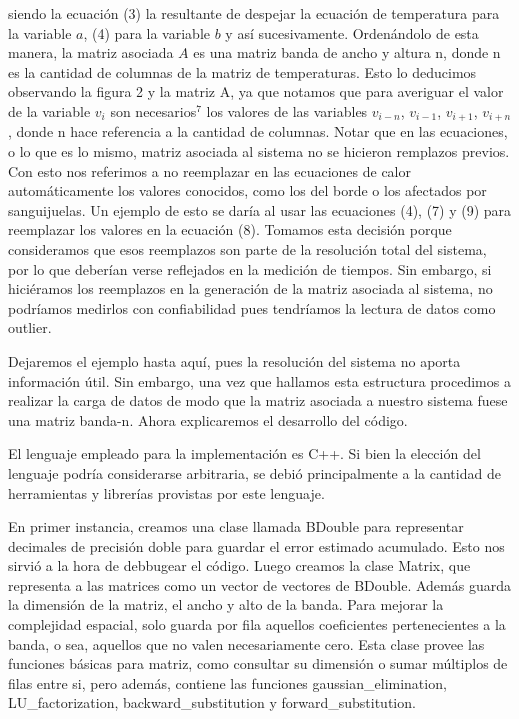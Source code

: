 siendo la ecuación (3) la resultante de despejar la ecuación de temperatura para la variable $a$, (4) para la variable $b$ y así sucesivamente.
Ordenándolo de esta manera, la matriz asociada $A$ es una matriz banda de ancho y altura n, donde n es la cantidad de columnas 
de la matriz de temperaturas. Esto lo deducimos observando la figura 2 y la matriz A,
ya que notamos que para averiguar el valor de la variable $v_{i}$ son necesarios$^7$ los valores de las variables $v_{i-n}$, $v_{i-1}$, 
$v_{i+1}$, $v_{i+n}$, donde n hace referencia a la cantidad de columnas.
Notar que en las ecuaciones, o lo que es lo mismo, matriz asociada al sistema no se hicieron remplazos previos. Con esto nos referimos a no reemplazar
 en las ecuaciones de calor automáticamente los valores conocidos, como los del borde o los afectados por sanguijuelas. Un ejemplo de esto se daría 
 al usar las ecuaciones (4), (7) y (9) para reemplazar los valores en la ecuación (8). Tomamos esta decisión porque consideramos que esos reemplazos son parte
 de la resolución total del sistema, por lo que deberían verse reflejados en la medición de tiempos. Sin embargo, si hiciéramos los reemplazos 
 en la generación de la matriz asociada al sistema, no podríamos medirlos con confiabilidad pues tendríamos la lectura de datos como outlier.

Dejaremos el ejemplo hasta aquí, pues la resolución del sistema no aporta información útil. Sin embargo, una vez que hallamos esta estructura 
procedimos a realizar la carga de datos de modo que la matriz asociada a nuestro sistema fuese una matriz banda-n. Ahora explicaremos el desarrollo del código.

El lenguaje empleado para la implementación es C++. Si bien la elección del lenguaje podría considerarse arbitraria, se debió principalmente a la 
cantidad de herramientas y librerías provistas por este lenguaje. 

En primer instancia, creamos una clase llamada BDouble para representar decimales de
precisión doble para guardar el error estimado acumulado. Esto nos sirvió a la hora de debbugear el código.
Luego creamos la clase Matrix, que representa a las matrices como un vector de vectores de BDouble. 
Además guarda la dimensión de la matriz, el ancho y alto de la banda. Para mejorar la complejidad espacial, solo guarda por fila aquellos
coeficientes pertenecientes a la banda, o sea, aquellos que no valen necesariamente cero. Esta clase provee las funciones básicas para matriz, como 
consultar su dimensión o sumar múltiplos de filas entre si, pero además, contiene las funciones gaussian\_elimination, LU\_factorization, backward\_substitution y 
forward\_substitution. 

